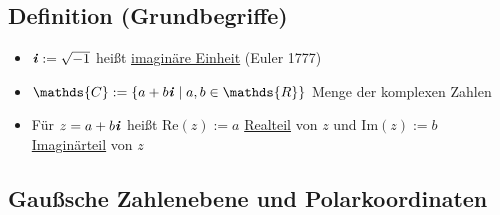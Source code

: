 \documentclass[a4paper, 12pt,titlepage, pdf, headsepline]{article}
\newcommand{\R}{\mathds{R}}
\newcommand{\uline}[1]{\underline{#1}}
\renewcommand{\Re}[1]{\text{Re}(#1)}
\renewcommand{\Im}[1]{\text{Im}(#1)}
\renewcommand{\i}{\textbf{\textit{i}}}
\renewcommand{\>}{\rightarrow}
\renewcommand{\*}{\cdot}
\begin{document}
		      	\subsection{Definition (Grundbegriffe)}
		      	\begin{itemize}
		      		\item $\i  := \sqrt{-1}$ heißt \uline{imaginäre Einheit} (Euler 1777)
		      		\item $\mathds{C} := \{a +b\i \mid a,b \in \R \}$ Menge der komplexen Zahlen
		      		\item Für $z = a +b\i$ heißt $\Re{z} :=a$ \uline{Realteil} von $z$ und $\Im{z} := b$ \uline{Imaginärteil} von $z$
		      	\end{itemize}
		      	\subsection*{Gaußsche Zahlenebene und Polarkoordinaten}
\end{document}
